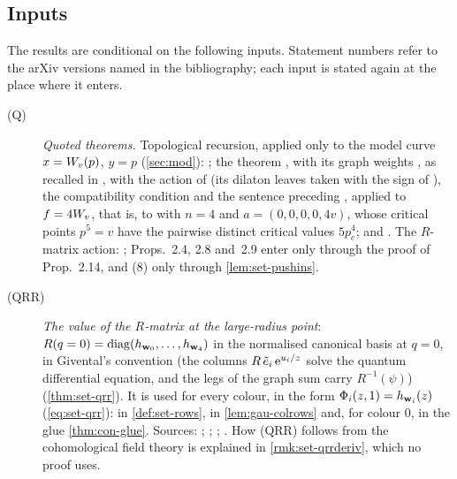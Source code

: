 
\subsection{Inputs}
\label{sec:int-inputs}

The results are conditional on the following inputs. Statement numbers refer to the arXiv versions named in the bibliography; each input is stated again at the place where it enters.
\begin{description}
\item[(Q)] \emph{Quoted theorems.} Topological recursion, applied only to the model curve $x=W_{v}(p)$, $y=p$ (\cref{sec:mod}): \cite[Def.~4.2, (4-9), with the kernel (4-3); Theorems~4.2 and~4.6; Theorem~5.1, (5-14), with \S5.3, (5-27)--(5-30)]{Eynard:2007kz}; the theorem \cite[Theorem~4.1]{DuninBarkowski:2012bw}, with its graph weights \cite[\S2.3]{DuninBarkowski:2012bw}, as recalled in \cite[\S2.6, (2-30)--(2-35)]{Dunin-Barkowski:2015caa}, with the action of \cite[\S2.3]{Dunin-Barkowski:2015caa} (its dilaton leaves taken with the sign of \cite[Def.~2.13]{PPZ15}), the compatibility condition \cite[Prop.~4.3 (1)]{Dunin-Barkowski:2015caa} and the sentence preceding \cite[Theorem~8.1]{Dunin-Barkowski:2015caa}, applied to $f=4W_{v}$, that is, to \cite[(8-1)]{Dunin-Barkowski:2015caa} with $n=4$ and $a=(0,0,0,0,4v)$, whose critical points $p^5=v$ have the pairwise distinct critical values $5p_c^4$; and \cite[Theorem~7.1: (7.6), (7.7) with its factor $1/\hbar^2$, (7.9), (7.10), with the kernel (1.1)]{ABDKS25}. The $R$-matrix action: \cite[\S0.2, (1); Def.~0.3 (iii); (5); Remark~2.1 and (6); Def.~2.2, with the convention stated after it; Prop.~2.4; Def.~2.5, with the convention stated after it; Props.~2.8 and~2.9; Prop.~2.12, with the formula (8) in its proof; Def.~2.13; Prop.~2.14]{PPZ15}; Props.~2.4, 2.8 and~2.9 enter only through the proof of Prop.~2.14, and (8) only through \cref{lem:set-pushins}.
\item[(QRR)] \emph{The value of the $R$-matrix at the large-radius point}: $R(q=0)=\operatorname{diag}(h_{\mathbf{w}_0},\dots,h_{\mathbf{w}_4})$ in the normalised canonical basis at $q=0$, in Givental's convention (the columns $R\,\tilde e_i\,\mathrm{e}^{u_i/z}$ solve the quantum differential equation, and the legs of the graph sum carry $R^{-1}(\psi)$) (\cref{thm:set-qrr}). It is used for every colour, in the form $\Phi_i(z,1)=h_{\mathbf{w}_i}(z)$ (\cref{eq:set-qrr}): in \cref{def:set-rows}, in \cref{lem:gau-colrows} and, for colour $0$, in the glue \cref{thm:con-glue}. Sources: \cite[(17), in the proof of Lemma~5.2]{GJR18}; \cite[(19)--(20), in the proof of Lemma~4.6, at $t=0$]{GJR17}; \cite[\S2.2, Theorem~1 and the Remark after it]{Giv01}; \cite[Theorem~1, Corollary~1]{MR2276766}. How (QRR) follows from the cohomological field theory is explained in \cref{rmk:set-qrrderiv}, which no proof uses.

\end{description}
